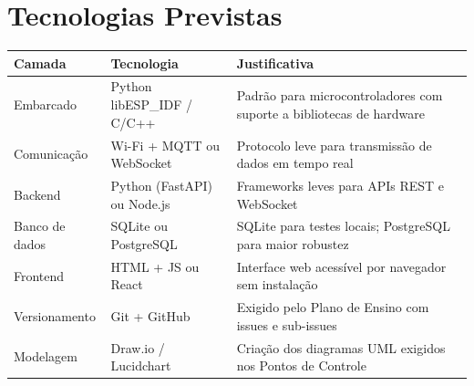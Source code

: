\documentclass[a4paper,12pt]{article}
\begin{document}
\section{Tecnologias Previstas}

\begin{table}[h!]
\centering
\begin{tabular}{|p{3.5cm}|p{4cm}|p{6.5cm}|}
\hline
\textbf{Camada} & \textbf{Tecnologia} & \textbf{Justificativa} \\
\hline
Embarcado & Python libESP\_IDF / C/C++ & Padrão para microcontroladores com suporte a bibliotecas de hardware \\
\hline
Comunicação & Wi-Fi + MQTT ou WebSocket & Protocolo leve para transmissão de dados em tempo real \\
\hline
Backend & Python (FastAPI) ou Node.js & Frameworks leves para APIs REST e WebSocket \\
\hline
Banco de dados & SQLite ou PostgreSQL & SQLite para testes locais; PostgreSQL para maior robustez \\
\hline
Frontend & HTML + JS ou React & Interface web acessível por navegador sem instalação \\
\hline
Versionamento & Git + GitHub & Exigido pelo Plano de Ensino com issues e sub-issues \\
\hline
Modelagem & Draw.io / Lucidchart & Criação dos diagramas UML exigidos nos Pontos de Controle \\
\hline
\end{tabular}
\end{table}
\end{document}

